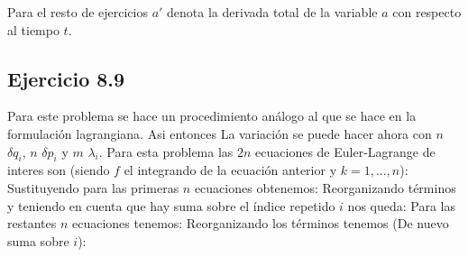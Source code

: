 Para el resto de ejercicios $a'$ denota la derivada total de la variable $a$ con respecto al tiempo $t$.\\


\subsection*{Ejercicio 8.9}
Para este problema se hace un procedimiento an\'alogo al que se hace en la formulaci\'on lagrangiana. Asi entonces
La variaci\'on se puede hacer  ahora con $n$ $\delta q_i$, $n$ $\delta p_i$ y $m$ $\lambda_i$.
Para esta problema las $2n$ ecuaciones de Euler-Lagrange de interes son (siendo $f$ el integrando de la ecuaci\'on anterior y $k=1,...,n$):
Sustituyendo para las primeras $n$ ecuaciones obtenemos:
Reorganizando t\'erminos  y teniendo en cuenta que hay suma sobre el \'indice repetido $i$ nos queda:
Para las restantes $n$ ecuaciones tenemos:
Reorganizando los t\'erminos tenemos (De nuevo suma sobre $i$):

